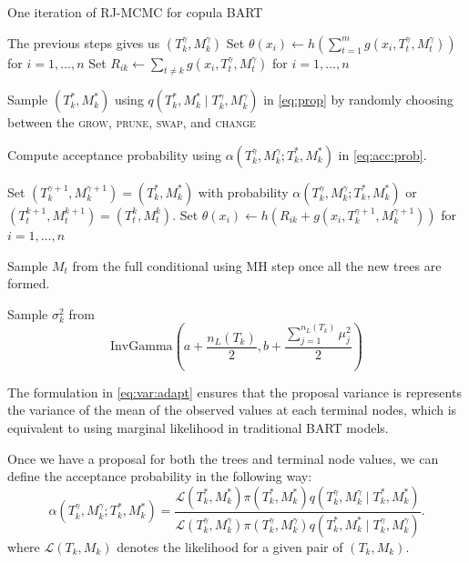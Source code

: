 \documentclass{amsart}
\begin{document}
\begin{algorithm}[H]
	\caption{One iteration of RJ-MCMC for copula BART}\label{alg:MCMC}
	\begin{algorithmic}[1]
		\State The previous steps gives us $(T_k^{\gamma},M_k^{\gamma})$
		\State Set $\theta(x_i) \leftarrow h\left(\sum_{t=1}^{m} g(x_i, T_t^{\gamma},M_t^{\gamma})\right)$ for $i = 1, \ldots, n$
		\State Set $R_{ik} \leftarrow \sum_{t\not=k}g(x_i, T_t^{\gamma},M_t^{\gamma})$ for $i = 1, \ldots, n$
		
		\State Sample $(T_k^\ast, M_k^\ast)$ using $q\left(T_k^\ast, M_k^\ast \mid T_k^{\gamma},M_k^{\gamma}\right)$ in \cref{eq:prop} by randomly choosing between the \textsc{grow}, \textsc{prune}, \textsc{swap}, and \textsc{change} 
		
		\State Compute acceptance probability using $\alpha\left(T_k^{\gamma},M_k^{\gamma};T_k^\ast, M_k^\ast\right)$ in \cref{eq:acc:prob}.
		
		\State Set $(T_k^{\gamma+1}, M_k^{\gamma+1})=(T_k^\ast, M_k^\ast)$ with probability $\alpha\left(T_k^{\gamma},M_k^{\gamma};T_k^\ast, M_k^\ast\right)$ or $(T_t^{k+1}, M_t^{k+1})=(T_t^k,M_t^k)$.
		\State Set $\theta(x_i) \leftarrow h(R_{ik} + g(x_i, T_k^{\gamma+1}, M_k^{\gamma+1}))$ for $i = 1, \ldots, n$
		
		\State Sample $M_t$ from the full conditional using MH step once all the new trees are formed.
		
		\State Sample $\sigma_{k}^2$ from 
		\begin{equation*}
			\text{InvGamma}\left(a+\frac{n_L(T_k)}{2} , b + \frac{\sum_{j=1}^{n_L(T_k)}\mu_j^2}{2}\right)
		\end{equation*}
		\EndFor
	\end{algorithmic}
\end{algorithm}

The formulation in \cref{eq:var:adapt} ensures that the proposal variance is represents the variance of the mean of the observed values at each terminal nodes, which is equivalent to using marginal likelihood in traditional BART models.


Once we have a proposal for both the trees and terminal node values, we can define the acceptance probability in the following way:
\begin{equation}\label{eq:acc:prob}
	\alpha\left(T_k^{\gamma},M_k^{\gamma};T_k^\ast, M_k^\ast\right)
	= \frac{\mathcal{L}(T_k^\ast,M_k^\ast)\pi(T_k^\ast,M_k^\ast)q\left(T_k^{\gamma},M_k^{\gamma}\mid T_k^\ast, M_k^\ast\right)}
	{\mathcal{L}(T_k^{\gamma},M_k^{\gamma})\pi(T_k^{\gamma},M_k^{\gamma}) q\left(T_k^\ast, M_k^\ast \mid T_k^{\gamma},M_k^{\gamma}\right)}.
\end{equation}
where $\mathcal{L}(T_k,M_k)$ denotes the likelihood for a given pair of $(T_k,M_k)$.
\end{document}
